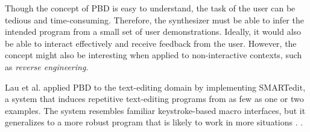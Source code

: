 Though the concept of \ac{PBD} is easy to understand, the task of the user can
be tedious and time-consuming. Therefore, the synthesizer must be able to infer
the intended program from a small set of user demonstrations. Ideally, it would
also be able to interact effectively and receive feedback from the user.
However, the concept might also be interesting when applied to non-interactive
contexts, such as \textit{reverse engineering}.

Lau et al. applied \ac{PBD} to the text-editing domain by implementing
SMARTedit, a system that induces repetitive text-editing programs from as few as
one or two examples. The system resembles familiar keystroke-based macro
interfaces, but it generalizes to a more robust program that is likely to work
in more situations \cite{Lau2003}.  \cite{Lau:traces:2003}.
